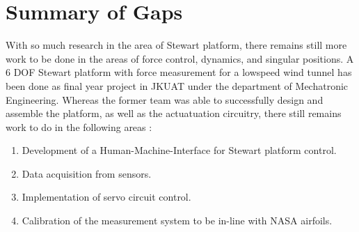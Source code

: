 \section{Summary of Gaps}
With so much research in the area of Stewart platform, there remains still more work to be done in the areas of force control, dynamics, and singular positions. A 6 DOF Stewart platform with force measurement for a lowspeed wind tunnel has been done as final year project in JKUAT under the department of Mechatronic Engineering. Whereas the former team was able to successfully design and assemble the platform, as well as the actuatuation circuitry, there still remains work to do in the following areas \cite{caleb}:
\begin{enumerate}
\item Development of a Human-Machine-Interface for Stewart platform control.
\item Data acquisition from sensors.
\item Implementation of servo circuit control.
\item Calibration of the measurement system to be in-line with NASA airfoils.
\end{enumerate}